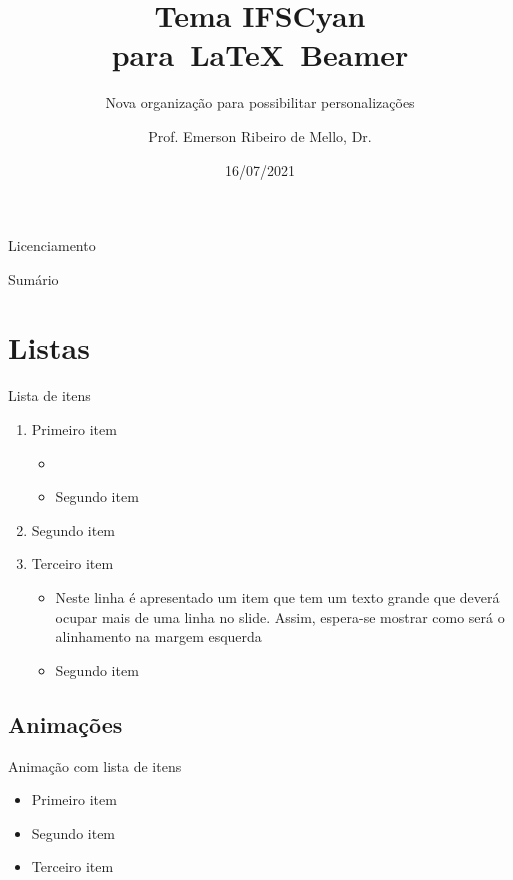 \documentclass[aspectratio=169]{beamer}
\title{Tema IFSCyan para~\LaTeX~Beamer}
\subtitle{Nova organização para possibilitar personalizações}
\author{Prof. Emerson Ribeiro de Mello, Dr.}
\institute{%
\url{mello@ifsc.edu.br}%
}%
\date{16/07/2021}
\begin{document}
\begin{frame}[plain]
    \titlepage
\end{frame}

\begin{frame}{Licenciamento}
    \licenciamentoLivre
\end{frame}

\begin{frame}{Sumário}
    \tableofcontents
\end{frame}



\section{Listas}


\begin{frame}{Lista de itens}
    \begin{enumerate}
        \item Primeiro item
        \begin{itemize}
            \item {}
            \item Segundo item
        \end{itemize}
        \item Segundo item
        \item Terceiro item 
        \begin{itemize}
            \item Neste linha é apresentado um item que tem um texto grande que deverá ocupar mais de uma linha no slide. Assim, espera-se mostrar como será o alinhamento na margem esquerda
            \item Segundo item
        \end{itemize}
    \end{enumerate}
\end{frame}

\subsection{Animações}

\begin{frame}{Animação com lista de itens}
\begin{itemize}[<+->]
    \item Primeiro item
    \item Segundo item
    \item Terceiro item
\end{itemize}
\end{frame}
\end{document}
